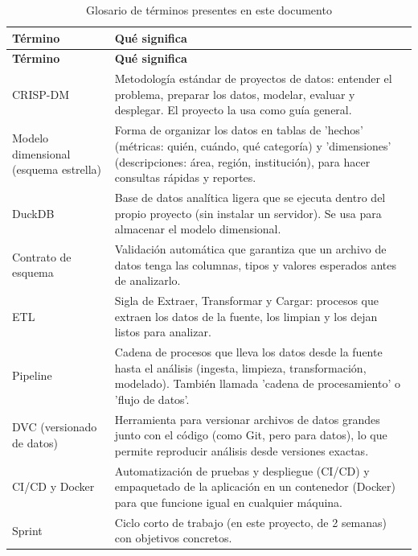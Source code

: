 \begingroup
\small
\setlength{\tabcolsep}{3pt}
\begin{longtable}{>{\raggedright\arraybackslash}p{4.3cm}>{\raggedright\arraybackslash}p{9.8cm}}
\caption{Glosario de términos presentes en este documento}
\label{tab:glosario}\\
\toprule
\textbf{Término} & \textbf{Qué significa} \\
\midrule
\endfirsthead
\toprule
\textbf{Término} & \textbf{Qué significa} \\
\midrule
\endhead
    CRISP-DM & Metodología estándar de proyectos de datos: entender el problema, preparar los datos, modelar, evaluar y desplegar. El proyecto la usa como guía general.
 \\
    Modelo dimensional (esquema estrella) & Forma de organizar los datos en tablas de 'hechos' (métricas: quién, cuándo, qué categoría) y 'dimensiones' (descripciones: área, región, institución), para hacer consultas rápidas y reportes.
 \\
    DuckDB & Base de datos analítica ligera que se ejecuta dentro del propio proyecto (sin instalar un servidor). Se usa para almacenar el modelo dimensional.
 \\
    Contrato de esquema & Validación automática que garantiza que un archivo de datos tenga las columnas, tipos y valores esperados antes de analizarlo.
 \\
    ETL & Sigla de Extraer, Transformar y Cargar: procesos que extraen los datos de la fuente, los limpian y los dejan listos para analizar.
 \\
    Pipeline & Cadena de procesos que lleva los datos desde la fuente hasta el análisis (ingesta, limpieza, transformación, modelado). También llamada 'cadena de procesamiento' o 'flujo de datos'.
 \\
    DVC (versionado de datos) & Herramienta para versionar archivos de datos grandes junto con el código (como Git, pero para datos), lo que permite reproducir análisis desde versiones exactas.
 \\
    CI/CD y Docker & Automatización de pruebas y despliegue (CI/CD) y empaquetado de la aplicación en un contenedor (Docker) para que funcione igual en cualquier máquina.
 \\
    Sprint & Ciclo corto de trabajo (en este proyecto, de 2 semanas) con objetivos concretos.
 \\
\bottomrule
\end{longtable}
\endgroup
